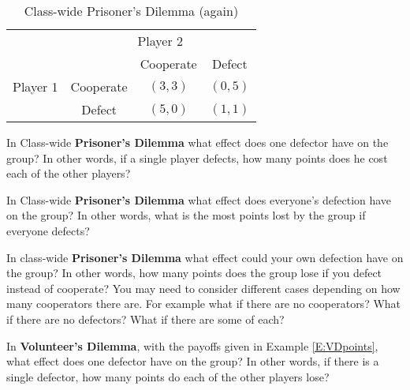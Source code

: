 \begin{table}[h]
\centering

\begin{tabular}{cccc}
                      & \multicolumn{3}{c}{Player 2}                                                  \\ \cline{2-4} 
\multicolumn{1}{l|}{} & \multicolumn{1}{l|}{} & \multicolumn{1}{c|}{Cooperate} & \multicolumn{1}{c|}{Defect} \\ \cline{2-4} 
\multicolumn{1}{l|}{Player 1} & \multicolumn{1}{c|}{Cooperate} & \multicolumn{1}{c|}{$(3, 3)$} & \multicolumn{1}{c|}{$(0, 5)$} \\ \cline{2-4} 
\multicolumn{1}{l|}{} & \multicolumn{1}{c|}{Defect} & \multicolumn{1}{c|}{$(5, 0)$} & \multicolumn{1}{c|}{$(1, 1)$} \\ \cline{2-4} 
\end{tabular}
\caption{Class-wide Prisoner's Dilemma (again)}
\label{T:CWPD2}
\end{table}


 
\begin{xca}\label{E:CWPDdefecteffect}
In Class-wide \textbf{Prisoner's Dilemma} what effect does one defector have on the group? In other words, if a single player defects, how many points does he cost each of the other players?
\end{xca}

\begin{xca}\label{E:CWPDalldefecteffect}
In Class-wide \textbf{Prisoner's Dilemma} what effect does everyone's defection have on the group? In other words, what is the most points lost by the group if everyone defects?
\end{xca}

\begin{xca}\label{E:CWPDowndefect} 
In class-wide \textbf{Prisoner's Dilemma} what effect could your own defection have on the group? In other words, how many points does the group lose if you defect instead of cooperate? You may need to consider different cases depending on how many cooperators there are. For example what if there are no cooperators? What if there are no defectors? What if there are some of each?
\end{xca}

\begin{xca}\label{E:VDdefecteffect} 
In \textbf{Volunteer's Dilemma}, with the payoffs given in Example \ref{E:VDpoints}, what effect does one defector have on the group? In other words, if there is a single defector, how many points do each of the other players lose?
\end{xca}

